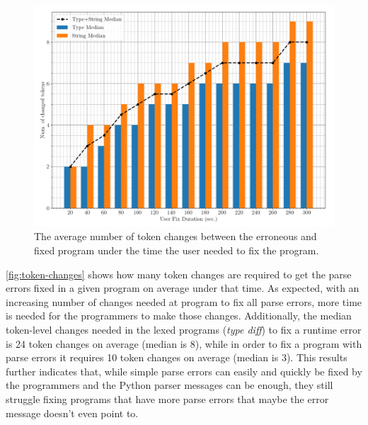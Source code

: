\begin{figure}[h]
  \centering
  \includegraphics[width=0.9\linewidth]{token-changes.png}
  \caption{The average number of token changes between the erroneous and fixed
  program under the time the user needed to fix the program.}
  \label{fig:token-changes}
\end{figure}

 \autoref{fig:token-changes} shows how many token
changes are required to get the parse errors fixed in a given program on average
under that time. As expected, with an increasing number of changes needed at
program to fix all parse errors, more time is needed for the programmers to make
those changes. Additionally, the median token-level changes needed in the lexed
programs (\eg \emph{type diff}) to fix a runtime error is 24 token changes on
average (median is 8), while in order to fix a program with parse errors it
requires 10 token changes on average (median is 3). This results further
indicates that, while simple parse errors can easily and quickly be fixed by the
programmers and the Python parser messages can be enough, they still struggle
fixing programs that have more parse errors that maybe the error message doesn't
even point to.
